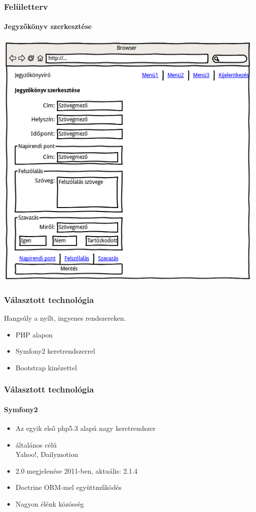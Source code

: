 \documentclass[11pt]{beamer}
\begin{document}
\begin{frame}
    \frametitle{Felületterv}
    \framesubtitle{Jegyzőkönyv szerkesztése}
    \begin{center}
        \includegraphics[height=0.8\textheight]{../kepek/wireframe-jegyzokonyvszerkesztes.png}
    \end{center}
\end{frame}

\begin{frame}
    \frametitle{Választott technológia}

    Hangsúly a nyílt, ingyenes rendszereken.
    
    \begin{itemize}
        \item PHP alapon
        \item Symfony2 keretrendszerrel
        \item Bootstrap kinézettel
    \end{itemize}
\end{frame}

\begin{frame}
    \frametitle{Választott technológia}
    \framesubtitle{Symfony2}
    
    \begin{itemize}
        \item Az egyik első php5.3 alapú nagy keretrendszer
        \item általános célú\\
            \small{Yahoo!, Dailymotion}
        \item 2.0 megjelenése 2011-ben, aktuális: 2.1.4
        \item Doctrine ORM-mel együttműködés
        \item Nagyon élénk közösség
    \end{itemize}
\end{frame}
\end{document}
